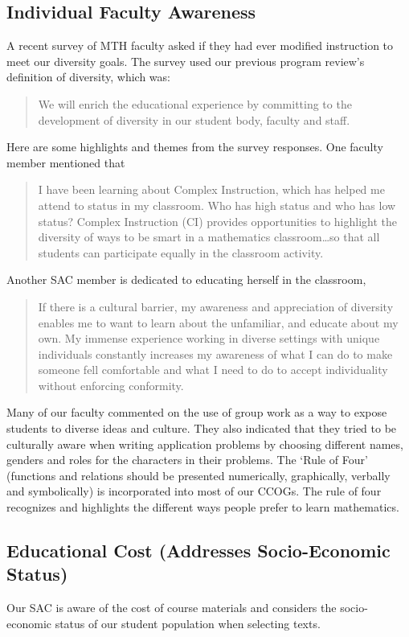 \subsection{Individual Faculty Awareness}
A recent survey of MTH faculty asked if they had ever modified instruction to meet our diversity goals. The survey used our previous program review's definition of diversity, which was:
\begin{quote}
  We will enrich the educational experience by committing to the development of diversity in our student body, faculty and staff.
\end{quote}
Here are some highlights and themes from the survey responses. One faculty member mentioned that 
\begin{quote}
  I have been learning about Complex Instruction, which has helped me attend to status in my classroom. Who has high status and who has low status? Complex Instruction (CI) provides opportunities to highlight the diversity of ways to be smart in a mathematics classroom\ldots so that all students can participate equally in the classroom activity.
\end{quote}
Another SAC member is dedicated to educating herself in the classroom, 
\begin{quote}
  If there is a cultural barrier, my awareness and appreciation of diversity enables me to want to learn about the unfamiliar, and educate about my own. My immense experience working in diverse settings with unique individuals constantly increases my awareness of what I can do to make someone fell comfortable and what I need to do to accept individuality without enforcing conformity.
\end{quote}
Many of our faculty commented on the use of group work as a way to expose students to diverse ideas and culture.  They also indicated that they tried to be culturally aware when writing application problems by choosing different names, genders and roles for the characters in their problems. The `Rule of Four' (functions and relations should be presented numerically, graphically, verbally and symbolically) is incorporated into most of our CCOGs. The rule of four recognizes and highlights the different ways people prefer to learn mathematics.
\subsection{Educational Cost (Addresses Socio-Economic Status)}
Our SAC is aware of the cost of course materials and considers the socio-economic status of our student population when selecting texts. 

